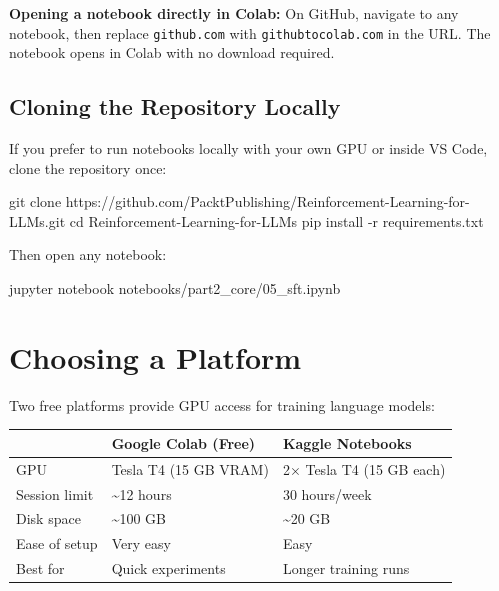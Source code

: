 \begin{chapterenv}
\begin{tipbox}
\textbf{Opening a notebook directly in Colab:} On GitHub, navigate to any notebook, then replace \texttt{github.com} with \texttt{githubtocolab.com} in the URL. The notebook opens in Colab with no download required.
\end{tipbox}

\subsection{Cloning the Repository Locally}

If you prefer to run notebooks locally with your own GPU or inside VS Code, clone the repository once:

\begin{codeblock}[bash]
git clone https://github.com/PacktPublishing/Reinforcement-Learning-for-LLMs.git
cd Reinforcement-Learning-for-LLMs
pip install -r requirements.txt
\end{codeblock}

Then open any notebook:

\begin{codeblock}[bash]
jupyter notebook notebooks/part2_core/05_sft.ipynb
\end{codeblock}

\section{Choosing a Platform}

Two free platforms provide GPU access for training language models:

\begin{center}
\begin{tabular}{p{}p{}p{}}
\toprule
& \textbf{Google Colab (Free)} & \textbf{Kaggle Notebooks} \\
\midrule
GPU & Tesla T4 (15 GB VRAM) & 2$\times$ Tesla T4 (15 GB each) \\
Session limit & \textasciitilde12 hours & 30 hours/week \\
Disk space & \textasciitilde100 GB & \textasciitilde20 GB \\
Ease of setup & Very easy & Easy \\
Best for & Quick experiments & Longer training runs \\
\bottomrule
\end{tabular}
\end{center}


\end{chapterenv}
